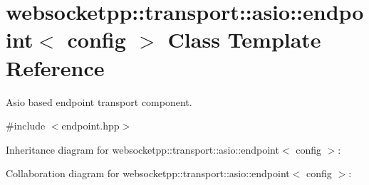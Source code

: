 \hypertarget{classwebsocketpp_1_1transport_1_1asio_1_1endpoint}{}\section{websocketpp\+:\+:transport\+:\+:asio\+:\+:endpoint$<$ config $>$ Class Template Reference}
\label{classwebsocketpp_1_1transport_1_1asio_1_1endpoint}


Asio based endpoint transport component.  




{\ttfamily \#include $<$endpoint.\+hpp$>$}



Inheritance diagram for websocketpp\+:\+:transport\+:\+:asio\+:\+:endpoint$<$ config $>$\+:


Collaboration diagram for websocketpp\+:\+:transport\+:\+:asio\+:\+:endpoint$<$ config $>$\+:
